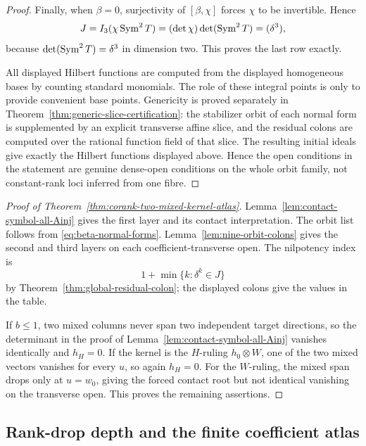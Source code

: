 \begin{proof}
Finally, when \(\beta=0\), surjectivity of
\([\beta,\chi]\) forces \(\chi\) to be invertible.  Hence
\[
 J=I_3(\chi\operatorname{Sym}^2T)
   =(\det\chi)\det(\operatorname{Sym}^2T)
   =(\delta^3),
\]
because \(\det(\operatorname{Sym}^2T)=\delta^3\) in dimension two.  This proves the
last row exactly.

All displayed Hilbert functions are computed from the displayed
homogeneous bases by counting standard monomials.  The role of these
integral points is only to provide convenient base points.
Genericity is proved separately in
Theorem~\ref{thm:generic-slice-certification}: the stabilizer orbit
of each normal form is supplemented by an explicit transverse affine
slice, and the residual colons are computed over the rational
function field of that slice.  The resulting initial ideals give
exactly the Hilbert functions displayed above.  Hence the open
conditions in the statement are genuine dense-open conditions on the
whole orbit family, not constant-rank loci inferred from one fibre.
\end{proof}

\begin{proof}[Proof of Theorem~\ref{thm:corank-two-mixed-kernel-atlas}]
Lemma~\ref{lem:contact-symbol-all-Ainj} gives the first layer and its
contact interpretation.  The orbit list follows from
\eqref{eq:beta-normal-forms}.  Lemma~\ref{lem:nine-orbit-colons}
gives the second and third layers on each coefficient-transverse open.
The nilpotency index is
\[
 1+\min\{k:\delta^k\in J\}
\]
by Theorem~\ref{thm:global-residual-colon}; the displayed colons give
the values in the table.

If \(b\le1\), two mixed columns never span two independent target
directions, so the determinant in the proof of
Lemma~\ref{lem:contact-symbol-all-Ainj} vanishes identically and
\(h_H=0\).  If the kernel is the \(H\)-ruling
\(h_0\otimes W\), one of the two mixed vectors vanishes for every
\(u\), so again \(h_H=0\).  For the \(W\)-ruling, the mixed span
drops only at \(u=w_0\), giving the forced contact root but not
identical vanishing on the transverse open.  This proves the
remaining assertions.
\end{proof}

\subsection{Rank-drop depth and the finite coefficient atlas}

